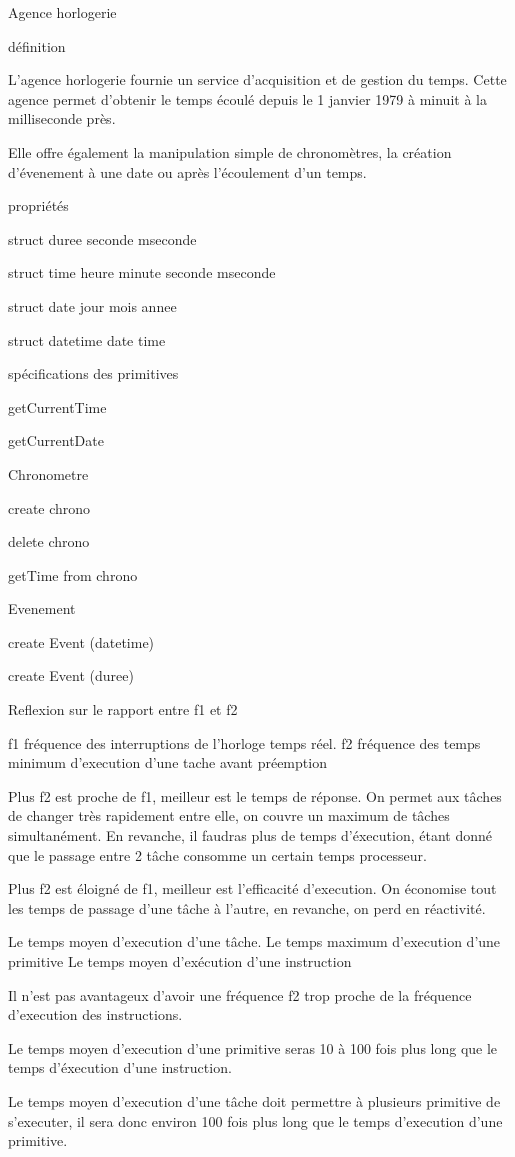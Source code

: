 Agence horlogerie

définition

L'agence horlogerie fournie un service d'acquisition et de gestion du temps.
Cette agence permet d'obtenir le temps écoulé depuis le 1 janvier 1979 à minuit à la milliseconde près.

Elle offre également la manipulation simple de chronomètres, la création d'évenement à une date ou après l'écoulement d'un temps.

propriétés

struct duree
seconde
mseconde

struct time
heure
minute
seconde
mseconde

struct date
jour
mois
annee

struct datetime
date
time

spécifications des primitives

getCurrentTime

getCurrentDate

Chronometre

	create chrono

	delete chrono

	getTime from chrono


Evenement

	create Event (datetime)

	create Event (duree)

Reflexion sur le rapport entre f1 et f2

f1 fréquence des interruptions de l'horloge temps réel.
f2 fréquence des temps minimum d'execution d'une tache avant préemption

Plus f2 est proche de f1, meilleur est le temps de réponse.
On permet aux tâches de changer très rapidement entre elle, on couvre un maximum de tâches simultanément.
En revanche, il faudras plus de temps d'éxecution, étant donné que le passage entre 2 tâche consomme un certain temps processeur.

Plus f2 est éloigné de f1, meilleur est l'efficacité d'execution.
On économise tout les temps de passage d'une tâche à l'autre, en revanche, on perd en réactivité.

Le temps moyen d'execution d'une tâche.
Le temps maximum d'execution d'une primitive
Le temps moyen d'exécution d'une instruction



Il n'est pas avantageux d'avoir une fréquence f2 trop proche de la fréquence d'execution des instructions.

Le temps moyen d'execution d'une primitive seras 10 à 100 fois plus long que le temps d'éxecution d'une instruction.

Le temps moyen d'execution d'une tâche doit permettre à plusieurs primitive de s'executer, il sera donc environ 100 fois plus long que le temps d'execution d'une primitive.

